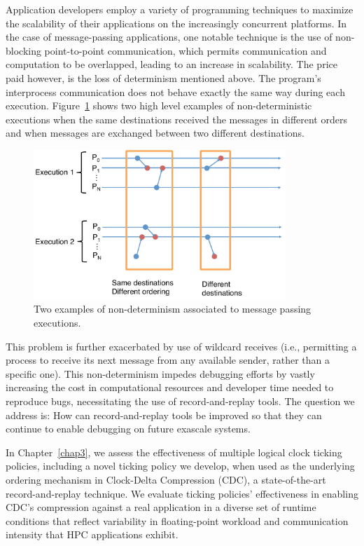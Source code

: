 Application developers employ a variety of programming techniques to
maximize the scalability of their applications on the increasingly
concurrent platforms. In the case of message-passing applications, one
notable technique is the use of non-blocking point-to-point
communication, which permits communication and computation to be
overlapped, leading to an increase in scalability. The price paid
however, is the loss of determinism mentioned above. The program's
interprocess communication does not behave exactly the same way during
each execution. Figure~\ref{fig:example_nondeterminism} shows two high
level examples of non-deterministic executions when the same
destinations received the messages in different orders and when
messages are exchanged between two different destinations.
\begin{figure}[!htb]
    \centering
    \includegraphics[width=0.85\textwidth]{chapter_1_figures/example_nondeterminism.pdf}
    \caption{Two examples of non-determinism associated to message
      passing executions.}
    \label{fig:example_nondeterminism}
\end{figure}
This problem is further exacerbated by use of wildcard receives (i.e.,
permitting a process to receive its next message from any available
sender, rather than a specific one). This non-determinism impedes
debugging efforts by vastly increasing the cost in computational resources
and developer time needed to reproduce bugs, necessitating the 
use of record-and-replay tools.
The question we address is: How can record-and-replay 
tools be improved so that they can continue to enable debugging on  
future exascale systems. 

In Chapter~\ref{chap3}, we assess the effectiveness of multiple logical
clock ticking policies, including a novel ticking policy we develop,
when used as the underlying ordering mechanism in
Clock-Delta Compression (CDC), a state-of-the-art record-and-replay technique. 
We evaluate ticking policies' effectiveness in enabling CDC's compression
against a real application in a diverse set of runtime conditions that 
reflect variability in floating-point workload and communication intensity 
that HPC applications exhibit. 

